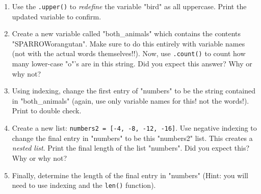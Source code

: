\documentclass{article}[12pt]
\newcommand{\code}[1]{\texttt{#1}}  %
\begin{document}
\begin{enumerate}
        \item Use the \code{.upper()} to \emph{redefine} the variable "bird" as all uppercase. Print the updated variable to confirm.
    
        \item Create a new variable called "both\_animals" which contains the contents "SPARROWorangutan". Make sure to do this entirely with variable names (not with the actual words themselves!!). Now, use \code{.count()} to count how many lower-case "o"'s are in this string. Did you expect this answer? Why or why not?
    
        \item Using indexing, change the first entry of "numbers" to be the string contained in "both\_animals" (again, use only variable names for this! not the words!). Print to double check. 

        \item Create a new list: \code{numbers2 = [-4, -8, -12, -16]}. Use negative indexing to change the final entry in "numbers" to be this "numbers2" list. This creates a \emph{nested list}. Print the final length of the list "numbers". Did you expect this? Why or why not?

        \item Finally, determine the length of the final entry in "numbers" (Hint: you will need to use indexing and the \code{len()} function).
    \end{enumerate}
\end{document}
